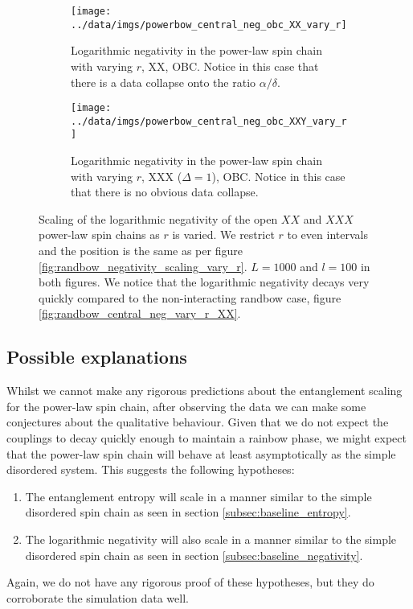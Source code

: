 \begin{figure}[h]
     \centering
     \begin{subfigure}[b]{0.8\textwidth}
   \centering
    \texttt{[image: ../data/imgs/powerbow\_central\_neg\_obc\_XX\_vary\_r]}
    \caption{Logarithmic negativity in the power-law spin chain with varying $r$, XX, OBC. Notice in this case that there is a data collapse onto the ratio $\alpha / \delta$.}
    \label{fig:powerbow_negativity_XX_vary_r}
    \end{subfigure}%
     \hfill
     \begin{subfigure}[b]{0.8\textwidth}
         \centering
   \texttt{[image: ../data/imgs/powerbow\_central\_neg\_obc\_XXY\_vary\_r]}
    \caption{Logarithmic negativity in the power-law spin chain with varying $r$, XXX ($\Delta = 1$), OBC. Notice in this case that there is no obvious data collapse.}
    \label{fig:powerbow_negativity_XXX_vary_r}

         \end{subfigure}
            \caption{Scaling of the logarithmic negativity of the open $XX$ and $XXX$ power-law spin chains as $r$ is varied. We restrict $r$ to even intervals and the position is the same as per figure \ref{fig:randbow_negativity_scaling_vary_r}. $L =1000$ and $l = 100$ in both figures. We notice that the logarithmic negativity decays very quickly compared to the non-interacting randbow case, figure \ref{fig:randbow_central_neg_vary_r_XX}.}
        \label{fig:powerbow_negativity_scaling_r}
\end{figure}

\subsection{Possible explanations}\label{subsec:powerbow_hypotheses}


Whilst we cannot make any rigorous predictions about the entanglement scaling for the power-law spin chain, after observing the data we can make some conjectures about the qualitative behaviour. Given that we do not expect the couplings to decay quickly enough to maintain a rainbow phase, we might expect that the power-law spin chain will behave at least asymptotically as the simple disordered system. This suggests the following hypotheses:

\begin{enumerate}
	\item The entanglement entropy will scale in a manner similar to the simple disordered spin chain as seen in section \ref{subsec:baseline_entropy}. 
	\item The logarithmic negativity will also scale in a manner similar to the simple disordered spin chain as seen in section \ref{subsec:baseline_negativity}. 
\end{enumerate}

Again, we do not have any rigorous proof of these hypotheses, but they do corroborate the simulation data well.





